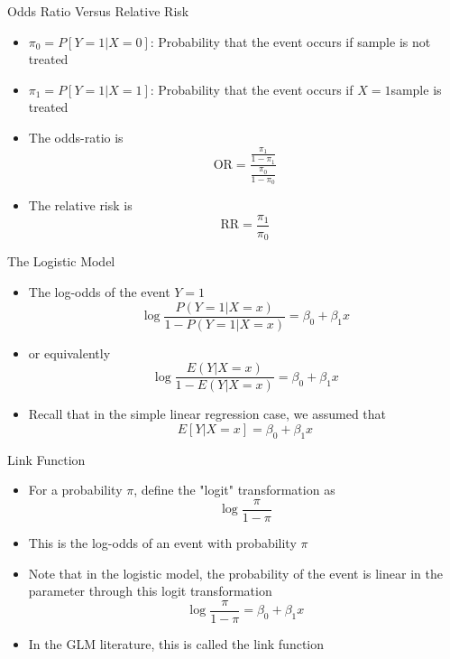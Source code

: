 \documentclass[xcolor=x11names,compress]{beamer}\usepackage[]{graphicx}\usepackage[]{color}
\begin{document}
\begin{frame}{Odds Ratio Versus Relative Risk}
  \begin{itemize}
  \item $\pi_0=P[Y=1|X=0]$: Probability that the event occurs if
        sample is not treated
   \item $\pi_1=P[Y=1|X=1]$: Probability that the event occurs if
        $X=1$sample is treated
   \item The odds-ratio is 
     \begin{equation*}
       \mathrm{OR} = \frac{\frac{\pi_1}{1-\pi_1}}{\frac{\pi_0}{1-\pi_0}}
     \end{equation*}
   \item The relative risk is 
     \begin{equation*}
       \mathrm{RR} = \frac{\pi_1}{\pi_0}
     \end{equation*}
  \end{itemize}
\end{frame}


\begin{frame}{The Logistic Model}
  \begin{itemize}
  \item The log-odds of the event $Y=1$ 
    \begin{equation*}
      \log \frac{P(Y=1|X=x)}{1-P(Y=1|X=x)} = \beta_0+\beta_1 x
    \end{equation*}
  \item or equivalently
       \begin{equation*}
      \log \frac{E(Y|X=x)}{1-E(Y|X=x)} = \beta_0+\beta_1 x
    \end{equation*}
    \item Recall that in the simple linear regression case, we assumed that
      \begin{equation*}
        E[Y|X=x]= \beta_0+\beta_1 x
      \end{equation*}
  \end{itemize}
\end{frame}

\begin{frame}{Link Function}
  \begin{itemize}
  \item For a probability $\pi$, define the "logit" transformation as
    \begin{equation*}
      \log \frac{\pi}{1-\pi}
    \end{equation*}
  \item This is the log-odds of an event with probability $\pi$
  \item Note that in the logistic model, the probability of the event is linear in the parameter through this
       logit transformation
         \begin{equation*}
      \log \frac{\pi}{1-\pi}= \beta_0+\beta_1 x
    \end{equation*}
  \item In the GLM literature, this is called the link function
  \end{itemize}
\end{frame}
\end{document}
